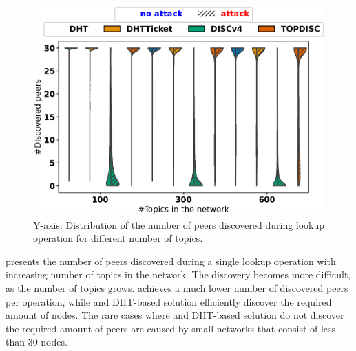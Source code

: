 \begin{figure}[!h]
\includegraphics[width=\linewidth]{results/split/topic_discovered.eps}
\caption{Y-axis: Distribution of the number of peers discovered during lookup operation for different number of topics.}
\label{fig:discoveredPerTopic}
\end{figure}

 presents the number of peers discovered during a single lookup operation with increasing number of topics in the network. The discovery becomes more difficult, as the number of topics grows.  \discv achieves a much lower number of discovered peers per operation, while \sysname and DHT-based solution efficiently discover the required amount of nodes. The rare cases where \sysname and DHT-based solution do not discover the required amount of peers are caused by small networks that consist of less than 30 nodes. 


